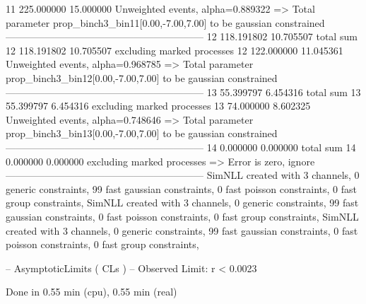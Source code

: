 11         225.000000      15.000000       Unweighted events, alpha=0.889322
  => Total parameter prop_binch3_bin11[0.00,-7.00,7.00] to be gaussian constrained
------------------------------------------------------------
12         118.191802      10.705507       total sum                     
12         118.191802      10.705507       excluding marked processes    
12         122.000000      11.045361       Unweighted events, alpha=0.968785
  => Total parameter prop_binch3_bin12[0.00,-7.00,7.00] to be gaussian constrained
------------------------------------------------------------
13         55.399797       6.454316        total sum                     
13         55.399797       6.454316        excluding marked processes    
13         74.000000       8.602325        Unweighted events, alpha=0.748646
  => Total parameter prop_binch3_bin13[0.00,-7.00,7.00] to be gaussian constrained
------------------------------------------------------------
14         0.000000        0.000000        total sum                     
14         0.000000        0.000000        excluding marked processes    
  => Error is zero, ignore      
------------------------------------------------------------
SimNLL created with 3 channels, 0 generic constraints, 99 fast gaussian constraints, 0 fast poisson constraints, 0 fast group constraints, 
SimNLL created with 3 channels, 0 generic constraints, 99 fast gaussian constraints, 0 fast poisson constraints, 0 fast group constraints, 
SimNLL created with 3 channels, 0 generic constraints, 99 fast gaussian constraints, 0 fast poisson constraints, 0 fast group constraints, 

 -- AsymptoticLimits ( CLs ) --
Observed Limit: r < 0.0023

Done in 0.55 min (cpu), 0.55 min (real)
